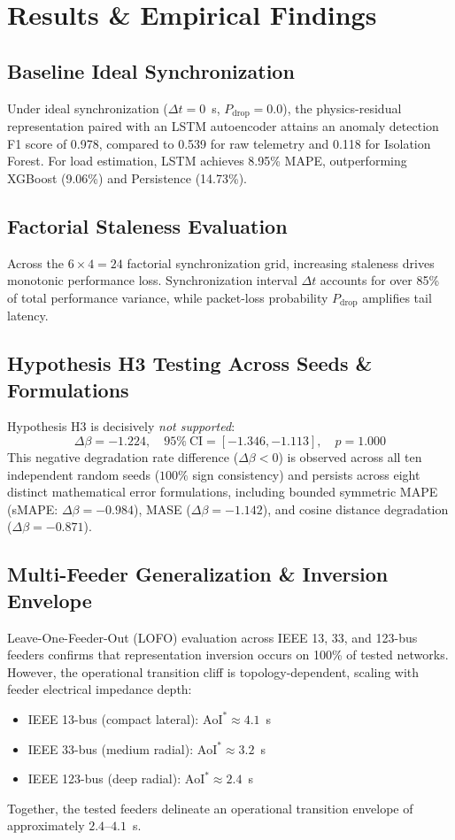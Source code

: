 \documentclass[journal]{IEEEtran}
\newcommand{\dtsync}{\Delta t}
\newcommand{\pdrop}{P_{\mathrm{drop}}}
\newcommand{\aoi}{\mathrm{AoI}}
\newcommand{\dbeta}{\Delta\beta}
\begin{document}
\section{Results & Empirical Findings}
\label{sec:results}

\subsection{Baseline Ideal Synchronization}
Under ideal synchronization ($\dtsync = 0$~s, $\pdrop = 0.0$), the physics-residual representation paired with an LSTM autoencoder attains an anomaly detection F1 score of 0.978, compared to 0.539 for raw telemetry and 0.118 for Isolation Forest. For load estimation, LSTM achieves 8.95\% MAPE, outperforming XGBoost (9.06\%) and Persistence (14.73\%).

\subsection{Factorial Staleness Evaluation}
Across the $6 \times 4 = 24$ factorial synchronization grid, increasing staleness drives monotonic performance loss. Synchronization interval $\dtsync$ accounts for over 85\% of total performance variance, while packet-loss probability $\pdrop$ amplifies tail latency.

\subsection{Hypothesis H3 Testing Across Seeds & Formulations}
Hypothesis H3 is decisively \emph{not supported}:
\begin{equation}
    \dbeta = -1.224, \quad 95\%~\text{CI} = [-1.346, -1.113], \quad p = 1.000
    \label{eq:h3_stat}
\end{equation}
This negative degradation rate difference ($\dbeta < 0$) is observed across all ten independent random seeds ($100\%$ sign consistency) and persists across eight distinct mathematical error formulations, including bounded symmetric MAPE (sMAPE: $\dbeta = -0.984$), MASE ($\dbeta = -1.142$), and cosine distance degradation ($\dbeta = -0.871$).

\subsection{Multi-Feeder Generalization & Inversion Envelope}
Leave-One-Feeder-Out (LOFO) evaluation across IEEE 13, 33, and 123-bus feeders confirms that representation inversion occurs on 100\% of tested networks. However, the operational transition cliff is topology-dependent, scaling with feeder electrical impedance depth:
\begin{itemize}
    \item IEEE 13-bus (compact lateral): $\aoi^* \approx 4.1$~s
    \item IEEE 33-bus (medium radial): $\aoi^* \approx 3.2$~s
    \item IEEE 123-bus (deep radial): $\aoi^* \approx 2.4$~s
\end{itemize}
Together, the tested feeders delineate an operational transition envelope of approximately $2.4$--$4.1$~s.
\end{document}
